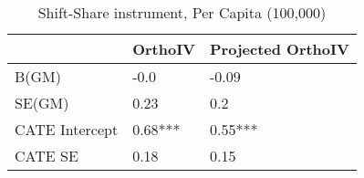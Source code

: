 \begin{table}\centering\caption{Shift-Share instrument, Per Capita (100,000)}\begin{tabular}{lll}
\toprule
                & OrthoIV   & Projected OrthoIV   \\
\midrule
 B(GM)          & -0.0      & -0.09               \\
 SE(GM)         & 0.23      & 0.2                 \\
 CATE Intercept & 0.68***   & 0.55***             \\
 CATE SE        & 0.18      & 0.15                \\
\bottomrule
\end{tabular}\end{table}